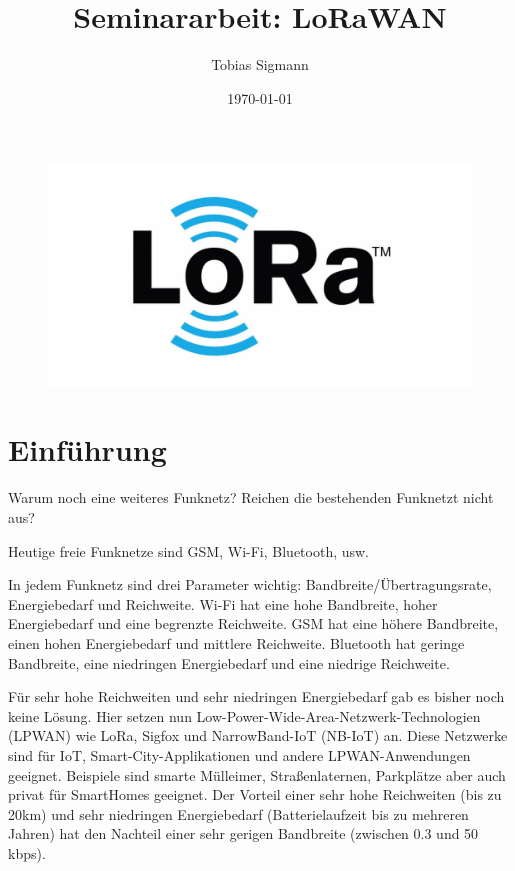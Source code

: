 \documentclass[a4paper, 12pt]{article}
\author{Tobias Sigmann}
\title{Seminararbeit: LoRaWAN}
\date{\today}
\begin{document}
    \maketitle
    \begin{figure}[ht]
        \centering
        \includegraphics[width=\textwidth]{LoRA}
    \end{figure}
    \newpage
    \tableofcontents
    \newpage

    \section{Einführung}
        Warum noch eine weiteres Funknetz? 
        Reichen die bestehenden Funknetzt nicht aus?

        Heutige freie Funknetze sind GSM, Wi-Fi, Bluetooth, usw.
        
        In jedem Funknetz sind drei Parameter wichtig: Bandbreite/Übertragungsrate, Energiebedarf und Reichweite.
        Wi-Fi hat eine hohe Bandbreite, hoher Energiebedarf und eine begrenzte Reichweite. 
        GSM hat eine höhere Bandbreite, einen hohen Energiebedarf und mittlere Reichweite.
        Bluetooth hat geringe Bandbreite, eine niedringen Energiebedarf und eine niedrige Reichweite.
        
        Für sehr hohe Reichweiten und sehr niedringen Energiebedarf gab es bisher noch keine Lösung.
        Hier setzen nun Low-­Power-Wide-Area-Netzwerk-Technologien
        (LPWAN) wie LoRa, Sigfox und NarrowBand-IoT (NB-IoT) an. Diese Netzwerke sind für IoT,
        Smart-City-Applikationen und andere LPWAN-Anwendungen geeignet.
        Beispiele sind smarte Mülleimer, Straßenlaternen, Parkplätze aber auch privat für SmartHomes geeignet.
        Der Vorteil einer sehr hohe Reichweiten (bis zu 20km) und sehr niedringen Energiebedarf (Batterielaufzeit
        bis zu mehreren Jahren) hat den Nachteil einer sehr gerigen Bandbreite (zwischen 0.3 und 50 kbps). 
\end{document}
